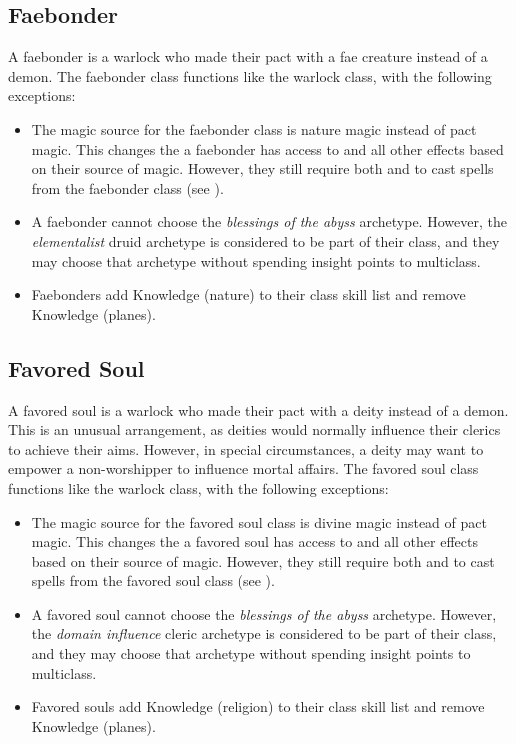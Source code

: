   \subsection{Faebonder}
    A faebonder is a warlock who made their pact with a fae creature instead of a demon.
    The faebonder class functions like the warlock class, with the following exceptions:
    \begin{itemize}
      \item The magic source for the faebonder class is nature magic instead of pact magic.
        This changes the  a faebonder has access to and all other effects based on their source of magic.
        However, they still require both  and  to cast spells from the faebonder class (see ).
      \item A faebonder cannot choose the \textit{blessings of the abyss} archetype. However, the \textit{elementalist} druid archetype is considered to be part of their class, and they may choose that archetype without spending insight points to multiclass.
      \item Faebonders add Knowledge (nature) to their class skill list and remove Knowledge (planes).
    \end{itemize}

  \subsection{Favored Soul}
    A favored soul is a warlock who made their pact with a deity instead of a demon.
    This is an unusual arrangement, as deities would normally influence their clerics to achieve their aims.
    However, in special circumstances, a deity may want to empower a non-worshipper to influence mortal affairs.
    The favored soul class functions like the warlock class, with the following exceptions:
    \begin{itemize}
      \item The magic source for the favored soul class is divine magic instead of pact magic.
        This changes the  a favored soul has access to and all other effects based on their source of magic.
        However, they still require both  and  to cast spells from the favored soul class (see ).
      \item A favored soul cannot choose the \textit{blessings of the abyss} archetype. However, the \textit{domain influence} cleric archetype is considered to be part of their class, and they may choose that archetype without spending insight points to multiclass.
      \item Favored souls add Knowledge (religion) to their class skill list and remove Knowledge (planes).
    \end{itemize}

